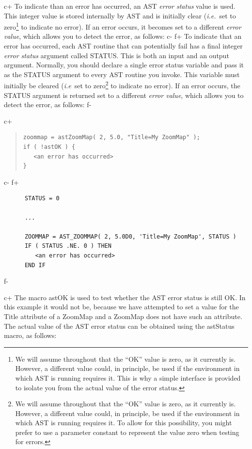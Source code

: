 \documentclass[twoside,11pt]{article}
\begin{document}
c+
To indicate than an error has occurred, an AST {\em{error status}}
value is used. This integer value is stored internally by AST and is
initially clear ({\em{i.e.}}\ set to zero\footnote{We will assume
throughout that the ``OK'' value is zero, as it currently is. However,
a different value could, in principle, be used if the environment in
which AST is running requires it. This is why a simple interface is
provided to isolate you from the actual value of the error status.}
to indicate no error). If an error occurs, it becomes set to a
different {\em{error value}}, which allows you to detect the error, as
follows:
c-
f+
To indicate that an error has occurred, each AST routine that can
potentially fail has a final integer {\em{error status}} argument
called STATUS.  This is both an input and an output argument.
Normally, you should declare a single error status variable and pass
it as the STATUS argument to every AST routine you invoke.  This
variable must initially be cleared ({\em{i.e}}\ set to
zero\footnote{We will assume throughout that the ``OK'' value is zero,
as it currently is. However, a different value could, in principle, be
used if the environment in which AST is running requires it. To allow
for this possibility, you might prefer to use a parameter constant to
represent the value zero when testing for errors.} to indicate no
error).  If an error occurs, the STATUS argument is returned set to a
different {\em{error value}}, which allows you to detect the error, as
follows:
f-

c+
\begin{quote}
\small
\begin{verbatim}
zoommap = astZoomMap( 2, 5.0, "Title=My ZoomMap" );
if ( !astOK ) {
   <an error has occurred>
}
\end{verbatim}
\normalsize
\end{quote}
c-
f+
\small
\begin{verbatim}
      STATUS = 0

      ...

      ZOOMMAP = AST_ZOOMMAP( 2, 5.0D0, 'Title=My ZoomMap', STATUS )
      IF ( STATUS .NE. 0 ) THEN
         <an error has occurred>
      END IF
\end{verbatim}
\normalsize
f-

c+
The macro astOK is used to test whether the AST error status is still
OK. In this example it would not be, because we have attempted to set
a value for the Title attribute of a ZoomMap and a ZoomMap does not
have such an attribute.  The actual value of the AST error status can
be obtained using the astStatus macro, as follows:
\end{document}
